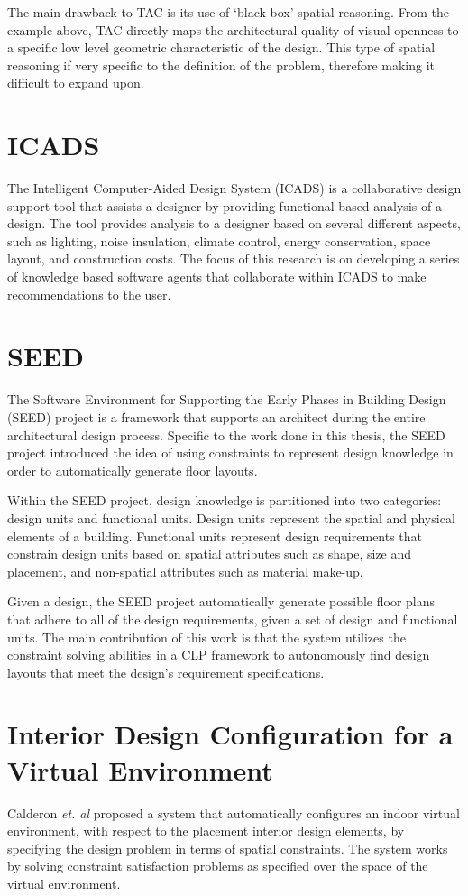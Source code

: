 \documentclass[12pt]{ucthesis}
\begin{document}
The main drawback to TAC is its use of `black box' spatial reasoning. From the example above, TAC directly maps the architectural quality of visual openness to a specific low level geometric characteristic of the design. This type of spatial reasoning if very specific to the definition of the problem, therefore making it difficult to expand upon. 


\section{ICADS}
The Intelligent Computer-Aided Design System (ICADS) \cite{ICADS} is a collaborative design support tool that assists a designer by providing functional based analysis of a design. The tool provides analysis to a designer based on several different aspects, such as lighting, noise insulation, climate control, energy conservation, space layout, and construction costs. The focus of this research is on developing a series of knowledge based software agents that collaborate within ICADS to make recommendations to the user. 

\section{SEED}
The Software Environment for Supporting the Early Phases in Building Design (SEED) \cite{SEEDS} project is a framework that supports an architect during the entire architectural design process. Specific to the work done in this thesis, the SEED project introduced the idea of using constraints to represent design knowledge in order to automatically generate floor layouts. 

Within the SEED project, design knowledge is partitioned into two categories: design units and functional units. Design units represent the spatial and physical elements of a building. Functional units represent design requirements that constrain design units based on spatial attributes such as shape, size and placement, and non-spatial attributes such as material make-up. 

Given a design, the SEED project automatically generate possible floor plans that adhere to all of the design requirements, given a set of design and functional units. The main contribution of this work is that the system utilizes the constraint solving abilities in a CLP framework to autonomously find design layouts that meet the design's requirement specifications.


\section{Interior Design Configuration for a Virtual \newline Environment}
Calderon \emph{et. al} \cite{Calderon06} proposed a system that automatically configures an indoor virtual environment, with respect to the placement interior design elements, by specifying the design problem in terms of spatial constraints. The system works by solving constraint satisfaction problems as specified over the space of the virtual environment.
\end{document}
